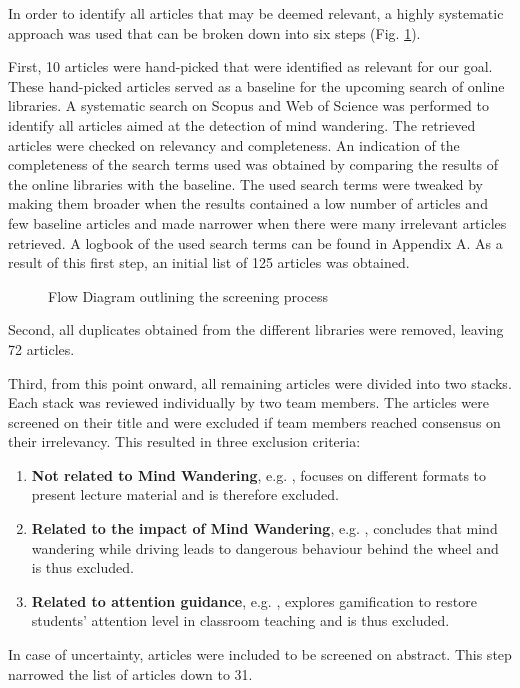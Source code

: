 
In order to identify all articles that may be deemed relevant, a highly systematic approach was used that can be broken down into six steps (Fig. \ref{fig:prisma}).

First, 10 articles were hand-picked that were identified as relevant for our goal. These hand-picked articles served as a baseline for the upcoming search of online libraries.
A systematic search on Scopus and Web of Science was performed to identify all articles aimed at the detection of mind wandering. The retrieved articles were checked on relevancy and completeness.
An indication of the completeness of the search terms used was obtained by comparing the results of the online libraries with the baseline. 
The used search terms were tweaked by making them broader when the results contained a low number of articles and few baseline articles and made narrower when there were many irrelevant articles retrieved.
A logbook of the used search terms can be found in Appendix A.
As a result of this first step, an initial list of 125 articles was obtained.

\begin{figure}
  \resizebox{\columnwidth}{!}{}
\caption{Flow Diagram outlining the screening process}
\label{fig:prisma}
\end{figure}

Second, all duplicates obtained from the different libraries were removed, leaving 72 articles.

Third, from this point onward, all remaining articles were divided into two stacks. Each stack was reviewed individually by two team members.
The articles were screened on their title and were excluded if team members reached consensus on their irrelevancy. 
This resulted in three exclusion criteria:
\begin{enumerate}
    \item \textbf{Not related to Mind Wandering}, e.g. \cite{ISI:000432512400017}, focuses on different formats to present lecture material and is therefore excluded.
    \item \textbf{Related to the impact of Mind Wandering}, e.g. \cite{Albert2018LinkingDrivers}, concludes that mind wandering while driving leads to dangerous behaviour behind the wheel and is thus excluded.
    \item \textbf{Related to attention guidance}, e.g. \cite{Xiao2018ClassroomMechanism}, explores gamification to restore students' attention level in classroom teaching and is thus excluded.
  \end{enumerate}
In case of uncertainty, articles were included to be screened on abstract. This step narrowed the list of articles down to 31.


